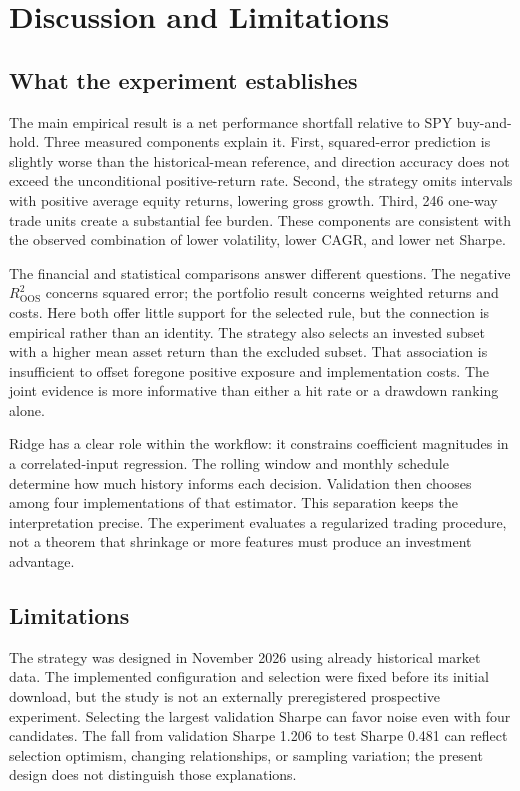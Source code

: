 \section{Discussion and Limitations}
\label{sec:discussion}
\subsection{What the experiment establishes}
The main empirical result is a net performance shortfall relative to SPY buy-and-hold. Three measured components explain it. First, squared-error prediction is slightly worse than the historical-mean reference, and direction accuracy does not exceed the unconditional positive-return rate. Second, the strategy omits intervals with positive average equity returns, lowering gross growth. Third, 246 one-way trade units create a substantial fee burden. These components are consistent with the observed combination of lower volatility, lower CAGR, and lower net Sharpe.

The financial and statistical comparisons answer different questions. The negative $R^2_{\mathrm{OOS}}$ concerns squared error; the portfolio result concerns weighted returns and costs. Here both offer little support for the selected rule, but the connection is empirical rather than an identity. The strategy also selects an invested subset with a higher mean asset return than the excluded subset. That association is insufficient to offset foregone positive exposure and implementation costs. The joint evidence is more informative than either a hit rate or a drawdown ranking alone.

Ridge has a clear role within the workflow: it constrains coefficient magnitudes in a correlated-input regression. The rolling window and monthly schedule determine how much history informs each decision. Validation then chooses among four implementations of that estimator. This separation keeps the interpretation precise. The experiment evaluates a regularized trading procedure, not a theorem that shrinkage or more features must produce an investment advantage.

\subsection{Limitations}
\label{sec:limitations}
The strategy was designed in November 2026 using already historical market data. The implemented configuration and selection were fixed before its initial download, but the study is not an externally preregistered prospective experiment. Selecting the largest validation Sharpe can favor noise even with four candidates. The fall from validation Sharpe 1.206 to test Sharpe 0.481 can reflect selection optimism, changing relationships, or sampling variation; the present design does not distinguish those explanations.


